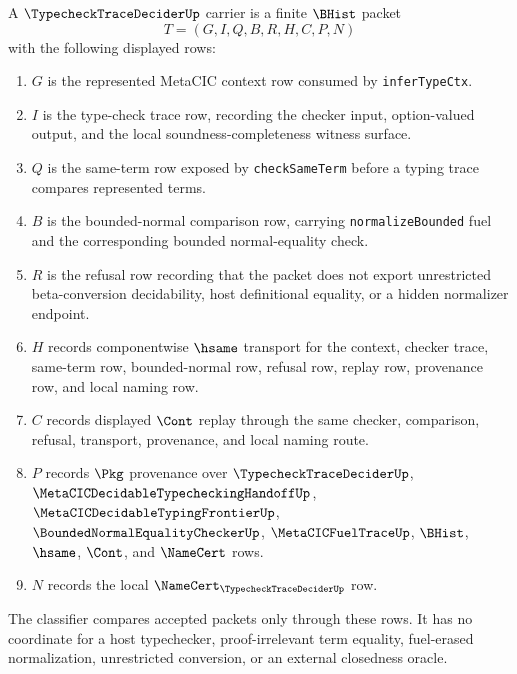 \begin{definition}
\label{def:typecheck-trace-decider-carrier}
A $\TypecheckTraceDeciderUp$ carrier is a finite $\BHist$ packet
$$
T=(G,I,Q,B,R,H,C,P,N)
$$
with the following displayed rows:
\begin{enumerate}
\item $G$ is the represented MetaCIC context row consumed by \texttt{inferTypeCtx}.
\item $I$ is the type-check trace row, recording the checker input, option-valued output, and the local soundness-completeness witness surface.
\item $Q$ is the same-term row exposed by \texttt{checkSameTerm} before a typing trace compares represented terms.
\item $B$ is the bounded-normal comparison row, carrying \texttt{normalizeBounded} fuel and the corresponding bounded normal-equality check.
\item $R$ is the refusal row recording that the packet does not export unrestricted beta-conversion decidability, host definitional equality, or a hidden normalizer endpoint.
\item $H$ records componentwise $\hsame$ transport for the context, checker trace, same-term row, bounded-normal row, refusal row, replay row, provenance row, and local naming row.
\item $C$ records displayed $\Cont$ replay through the same checker, comparison, refusal, transport, provenance, and local naming route.
\item $P$ records $\Pkg$ provenance over $\TypecheckTraceDeciderUp$, $\MetaCICDecidableTypecheckingHandoffUp$, $\MetaCICDecidableTypingFrontierUp$, $\BoundedNormalEqualityCheckerUp$, $\MetaCICFuelTraceUp$, $\BHist$, $\hsame$, $\Cont$, and $\NameCert$ rows.
\item $N$ records the local $\NameCert_{\TypecheckTraceDeciderUp}$ row.
\end{enumerate}
The classifier compares accepted packets only through these rows. It has no coordinate for a host typechecker, proof-irrelevant term equality, fuel-erased normalization, unrestricted conversion, or an external closedness oracle.
\end{definition}

